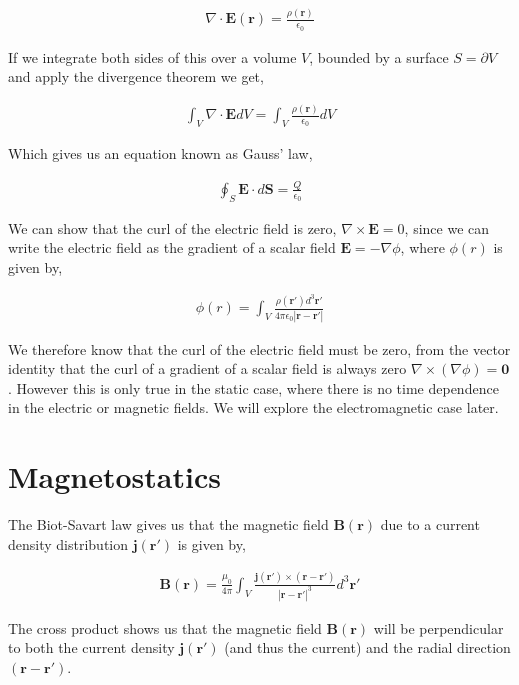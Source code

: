 \documentclass[11pt]{amsart}
\begin{document}
\begin{align*}
  \nabla\cdot\mathbf{E}(\mathbf{r}) = \frac{\rho(\mathbf{r})}{\epsilon_0}
\end{align*}

If we integrate both sides of this over a volume $V$, bounded by a surface $S = \partial V$ and apply the divergence theorem we get,

\begin{align*}
  \int_V \nabla\cdot\mathbf{E} dV = \int_V \frac{\rho(\mathbf{r})}{\epsilon_0} dV 
\end{align*}

Which gives us an equation known as Gauss' law,

\begin{align*}
  \oint_S \mathbf{E}\cdot d\mathbf{S} = \frac{Q}{\epsilon_0}
\end{align*}

We can show that the curl of the electric field is zero, $\nabla\times\mathbf{E}=0$, since we can write the electric field as the gradient of a scalar field $\mathbf{E} = -\nabla\phi$, where $\phi(r)$ is given by,

\begin{align*}
  \phi(r) = \int_V \frac{\rho(\mathbf{r'})d^3\mathbf{r'}}{4\pi\epsilon_0 |\mathbf{r} - \mathbf{r'}|}
\end{align*}

We therefore know that the curl of the electric field must be zero, from the vector identity that the curl of a gradient of a scalar field is always zero $\nabla\times(\nabla\phi) = \mathbf{0}$. However this is only true in the static case, where there is no time dependence in the electric or magnetic fields. We will explore the electromagnetic case later.


\section{Magnetostatics}


The Biot-Savart law gives us that the magnetic field $\mathbf{B}(\mathbf{r})$ due to a current density distribution $\mathbf{j}(\mathbf{r'})$ is given by,
  
\begin{align*}
  \mathbf{B}(\mathbf{r})=\frac{\mu_0}{4\pi}\int_V\frac{\mathbf{j}(\mathbf{r'})\times(\mathbf{r}-\mathbf{r'})}{{|\mathbf{r}-\mathbf{r'}|}^3} d^3\mathbf{r'}
\end{align*}

The cross product shows us that the magnetic field $\mathbf{B}(\mathbf{r})$ will be perpendicular to both the current density $\mathbf{j}(\mathbf{r'})$ (and thus the current) and the radial direction $(\mathbf{r} - \mathbf{r'})$.
\end{document}
